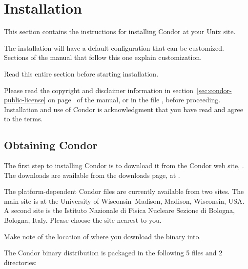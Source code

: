 \section{\label{sec:install}Installation}

This section contains the instructions for installing Condor at your
Unix site.

The installation will have a default configuration that can
be customized.
Sections of the manual that follow this one explain customization.

Read this entire section before starting installation.

Please read the copyright and disclaimer information in 
section~\ref{sec:condor-public-license} on
page~\pageref{sec:condor-public-license} of the manual, or in the
file , before proceeding.  Installation and
use of Condor is acknowledgment that you have read and agree to the
terms.

\subsection{\label{sec:pre-install-procedure}
Obtaining Condor}
The first step to installing Condor is to download it from the Condor
web site, .
The downloads are available from the downloads page,
at .

The platform-dependent Condor files are currently available from two sites.
The main site is at the University of Wisconsin--Madison,
Madison, Wisconsin, USA.
A second site is the Istituto Nazionale di Fisica Nucleare Sezione di
Bologna, Bologna, Italy.
Please choose the site nearest to you.

Make note of the location of where you download the binary into.

The Condor binary distribution is packaged in the following 5 files
and 2 directories:

